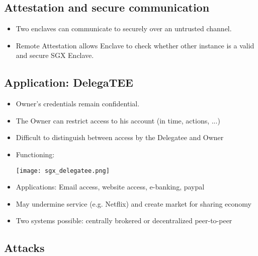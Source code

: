 \subsection{Attestation and secure communication}
\begin{itemize}
  \item Two enclaves can communicate to securely over an untrusted channel.
  \item Remote Attestation allows Enclave to check whether other instance is a
    valid and secure SGX Enclave.
\end{itemize}

\subsection{Application: DelegaTEE}
\begin{itemize}
  \item Owner's credentials remain confidential.
  \item The Owner can restrict access to his account (in time, actions,
    ...)
  \item Difficult to distinguish between access by the
    Delegatee and Owner
  \item Functioning:
    \begin{center}
      \texttt{[image: sgx\_delegatee.png]}
    \end{center}
  \item Applications: Email access, website access, e-banking, paypal
  \item May undermine service (e.g. Netflix) and create market for sharing
    economy
  \item Two systems possible: centrally brokered or decentralized
    peer-to-peer
\end{itemize}

\subsection{Attacks}

